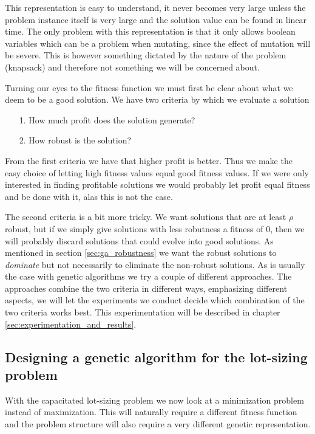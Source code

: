This representation is easy to understand, it never becomes very large
unless the problem instance itself is very large and the solution
value can be found in linear time. The only problem with this
representation is that it only allows boolean variables which can be a
problem when mutating, since the effect of mutation will be
severe. This is however something dictated by the nature of the
problem (knapsack) and therefore not something we will be concerned about.

Turning our eyes to the fitness function we must first be clear about
what we deem to be a good solution. We have two criteria by which we
evaluate a solution
\begin{itemize}
\item[1.] How much profit does the solution generate?
\item[2.] How robust is the solution?
\end{itemize}
From the first criteria we have that higher profit is better. Thus we
make the easy choice of letting high fitness values equal good fitness
values. If we were only interested in finding profitable solutions we
would probably let profit equal fitness and be done with it, alas this
is not the case.

The second criteria is a bit more tricky. We want solutions that are
at least $\rho$ robust, but if we simply give solutions with less
robutness a fitness of 0, then we will probably discard solutions that
could evolve into good solutions. As mentioned in section
\ref{sec:ga_robustness} we want the robust solutions to \emph{dominate}
but not necessarily to eliminate the non-robust solutions. As is usually the case with genetic
algorithms we try a couple of different approaches. The approaches
combine the two criteria in different ways, emphasizing different
aspects, we will let the experiments we conduct decide which
combination of the two criteria works best. This experimentation will
be described in chapter \ref{sec:experimentation_and_results}.

\subsection{Designing a genetic algorithm for the lot-sizing problem}
\label{sec:ga_lsp}

With the capacitated lot-sizing problem we now look at a minimization problem
instead of maximization. This will naturally require a different
fitness function and the problem structure will also require a very
different genetic representation. 

